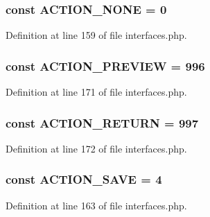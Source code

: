 \hypertarget{interfaceIXLUIHelper_a14ebb74e919040ff6ae640a85e26ad80}{
\subsubsection[{ACTION\_\-NONE}]{\setlength{\rightskip}{0pt plus 5cm}const {\bf ACTION\_\-NONE} = 0}}
\label{interfaceIXLUIHelper_a14ebb74e919040ff6ae640a85e26ad80}


Definition at line 159 of file interfaces.php.

\hypertarget{interfaceIXLUIHelper_a4bd6b76d55b3a5f5cecaaf7489dbcd88}{
\subsubsection[{ACTION\_\-PREVIEW}]{\setlength{\rightskip}{0pt plus 5cm}const {\bf ACTION\_\-PREVIEW} = 996}}
\label{interfaceIXLUIHelper_a4bd6b76d55b3a5f5cecaaf7489dbcd88}


Definition at line 171 of file interfaces.php.

\hypertarget{interfaceIXLUIHelper_a6954c10c63953015a160f802f79e59d2}{
\subsubsection[{ACTION\_\-RETURN}]{\setlength{\rightskip}{0pt plus 5cm}const {\bf ACTION\_\-RETURN} = 997}}
\label{interfaceIXLUIHelper_a6954c10c63953015a160f802f79e59d2}


Definition at line 172 of file interfaces.php.

\hypertarget{interfaceIXLUIHelper_a4f9b91b9d04c6c9d7b6ebb8ceb70c0c0}{
\subsubsection[{ACTION\_\-SAVE}]{\setlength{\rightskip}{0pt plus 5cm}const {\bf ACTION\_\-SAVE} = 4}}
\label{interfaceIXLUIHelper_a4f9b91b9d04c6c9d7b6ebb8ceb70c0c0}


Definition at line 163 of file interfaces.php.

